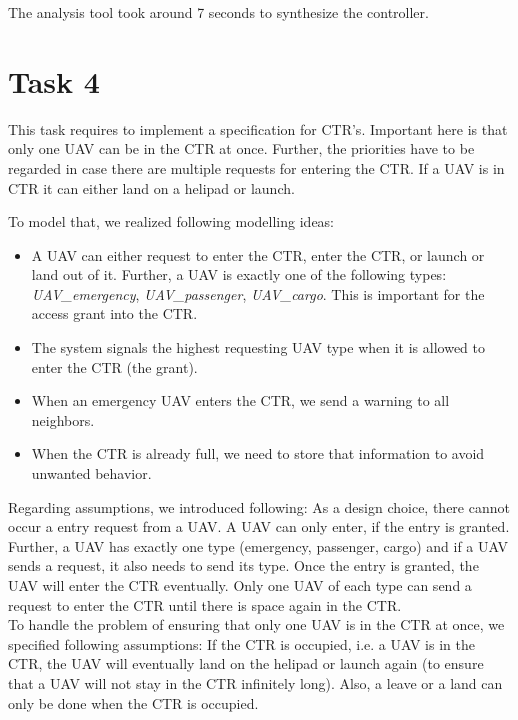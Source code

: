 \documentclass[	runningheads,
    a4paper]{llncs}
\begin{document}

    The analysis tool took around 7 seconds to synthesize the controller.




    \section*{Task 4}

    This task requires to implement a specification for CTR's. Important here is that only one UAV can be in the CTR at once. Further, the priorities have to be regarded in case there are multiple requests for entering the CTR. If a UAV is in CTR it can either land on a helipad or launch.

    To model that, we realized following modelling ideas:

    \begin{itemize}
        \item A UAV can either request to enter the CTR, enter the CTR, or launch or land out of it. Further, a UAV is exactly one of the following types: \textit{UAV\_emergency}, \textit{UAV\_passenger}, \textit{UAV\_cargo}. This is important for the access grant into the CTR.
        \item The system signals the highest requesting UAV type when it is allowed to enter the CTR (the grant).
        \item When an emergency UAV enters the CTR, we send a warning to all neighbors.
        \item When the CTR is already full, we need to store that information to avoid unwanted behavior.
    \end{itemize}

    Regarding assumptions, we introduced following: As a design choice, there cannot occur a entry request from a UAV. A UAV can only enter, if the entry is granted. Further, a UAV has exactly one type (emergency, passenger, cargo) and if a UAV sends a request, it also needs to send its type. Once the entry is granted, the UAV will enter the CTR eventually. Only one UAV of each type can send a request to enter the CTR until there is space again in the CTR.\\
    To handle the problem of ensuring that only one UAV is in the CTR at once, we specified following assumptions: If the CTR is occupied, i.e. a UAV is in the CTR, the UAV will eventually land on the helipad or launch again (to ensure that a UAV will not stay in the CTR infinitely long). Also, a leave or a land can only be done when the CTR is occupied.
\end{document}
